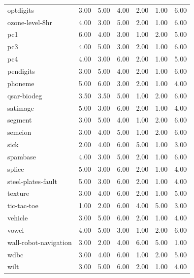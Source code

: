 \begin{table}[htbp]
\begin{tabular}{lrrrrrr}
optdigits & 3.00 & 5.00 & 4.00 & 2.00 & 1.00 & 6.00 \\
ozone-level-8hr & 4.00 & 3.00 & 5.00 & 2.00 & 1.00 & 6.00 \\
pc1 & 6.00 & 4.00 & 3.00 & 1.00 & 2.00 & 5.00 \\
pc3 & 4.00 & 5.00 & 3.00 & 2.00 & 1.00 & 6.00 \\
pc4 & 4.00 & 3.00 & 6.00 & 2.00 & 1.00 & 5.00 \\
pendigits & 3.00 & 5.00 & 4.00 & 2.00 & 1.00 & 6.00 \\
phoneme & 5.00 & 6.00 & 3.00 & 2.00 & 1.00 & 4.00 \\
qsar-biodeg & 3.50 & 3.50 & 5.00 & 1.00 & 2.00 & 6.00 \\
satimage & 5.00 & 3.00 & 6.00 & 2.00 & 1.00 & 4.00 \\
segment & 3.00 & 5.00 & 4.00 & 1.00 & 2.00 & 6.00 \\
semeion & 3.00 & 4.00 & 5.00 & 1.00 & 2.00 & 6.00 \\
sick & 2.00 & 4.00 & 6.00 & 5.00 & 1.00 & 3.00 \\
spambase & 4.00 & 3.00 & 5.00 & 2.00 & 1.00 & 6.00 \\
splice & 5.00 & 3.00 & 6.00 & 2.00 & 1.00 & 4.00 \\
steel-plates-fault & 5.00 & 3.00 & 6.00 & 2.00 & 1.00 & 4.00 \\
texture & 3.00 & 4.00 & 6.00 & 2.00 & 1.00 & 5.00 \\
tic-tac-toe & 1.00 & 2.00 & 6.00 & 4.00 & 5.00 & 3.00 \\
vehicle & 3.00 & 5.00 & 6.00 & 2.00 & 1.00 & 4.00 \\
vowel & 4.00 & 5.00 & 3.00 & 1.00 & 2.00 & 6.00 \\
wall-robot-navigation & 3.00 & 2.00 & 4.00 & 6.00 & 5.00 & 1.00 \\
wdbc & 3.00 & 4.00 & 6.00 & 1.00 & 2.00 & 5.00 \\
wilt & 3.00 & 5.00 & 6.00 & 2.00 & 1.00 & 4.00 \\
\hline
\end{tabular}
\end{table}
